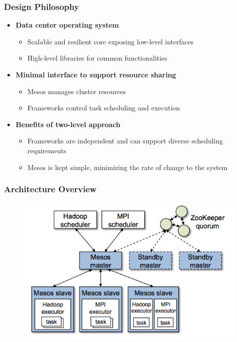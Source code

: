 \begin{frame}
\frametitle{Design Philosophy}
\begin{itemize}
	\item {\bf Data center operating system}
	\begin{itemize}
		\item Scalable and resilient core exposing low-level interfaces 
		\item High-level libraries for common functionalities
	\end{itemize}

\vspace{20pt}

	\item {\bf Minimal interface to support resource sharing}
	\begin{itemize}
		\item Mesos manages cluster resources
		\item Frameworks control task scheduling and execution
	\end{itemize}

\vspace{20pt}

	\item {\bf Benefits of two-level approach}
	\begin{itemize}
		\item Frameworks are independent and can support diverse scheduling requirements
		\item Mesos is kept simple, minimizing the rate of change to the system
	\end{itemize}
\end{itemize}
\end{frame}

\begin{frame}
\frametitle{Architecture Overview}
\begin{figure}[h]
  \centering
  \includegraphics[scale=0.6]{./figures/mesos_arch_overview}
  \label{fig:mesos_arch_overview}
\end{figure}
\end{frame}

